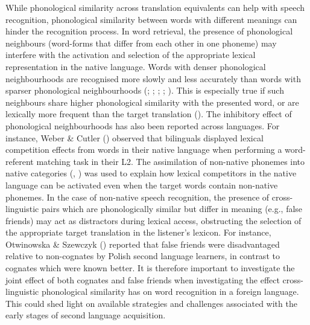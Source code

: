 \documentclass[
]{article}
\begin{document}
While phonological similarity across translation equivalents can help
with speech recognition, phonological similarity between words with
different meanings can hinder the recognition process. In word
retrieval, the presence of phonological neighbours (word-forms that
differ from each other in one phoneme) may interfere with the activation
and selection of the appropriate lexical representation in the native
language. Words with denser phonological neighbourhoods are recognised
more slowly and less accurately than words with sparser phonological
neighbourhoods (; ;
;
;
). This is
especially true if such neighbours share higher phonological similarity
with the presented word, or are lexically more frequent than the target
translation ().
The inhibitory effect of phonological neighbourhoods has also been
reported across languages. For instance, Weber \& Cutler
() observed that bilinguals
displayed lexical competition effects from words in their native
language when performing a word-referent matching task in their L2. The
assimilation of non-native phonemes into native categories
(,
) was used to explain how
lexical competitors in the native language can be activated even when
the target words contain non-native phonemes. In the case of non-native
speech recognition, the presence of cross-linguistic pairs which are
phonologically similar but differ in meaning (e.g., false friends) may
act as distractors during lexical access, obstructing the selection of
the appropriate target translation in the listener's lexicon. For
instance, Otwinowska \& Szewczyk
() reported that false friends
were disadvantaged relative to non-cognates by Polish second language
learners, in contrast to cognates which were known better. It is
therefore important to investigate the joint effect of both cognates and
false friends when investigating the effect cross-linguistic
phonological similarity has on word recognition in a foreign language.
This could shed light on available strategies and challenges associated
with the early stages of second language acquisition.
\end{document}
